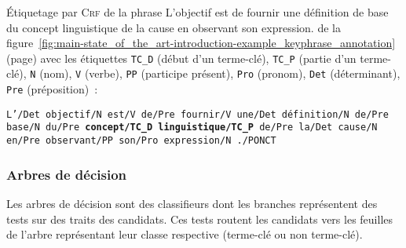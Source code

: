         \begin{example}\label{ex:crf_tagging}
          Étiquetage par \textsc{Crf} de la phrase \og{}L'objectif est de
          fournir une définition de base du concept linguistique de la cause en
          observant son expression.\fg{} de la
          figure~\ref{fig:main-state_of_the_art-introduction-example_keyphrase_annotation}
          (page\pageref{fig:main-state_of_the_art-introduction-example_keyphrase_annotation})
          avec les étiquettes \texttt{TC\_D} (début d'un terme-clé),
          \texttt{TC\_P} (partie d'un terme-clé), \texttt{N} (nom), \texttt{V}
          (verbe), \texttt{PP} (participe présent), \texttt{Pro} (pronom),
          \texttt{Det} (déterminant), \texttt{Pre} (préposition)~:\\
          \begin{center}\vspace{-1em}
            \parbox{.8\linewidth}{
              \texttt{L'/Det objectif/N est/V de/Pre fournir/V une/Det
              définition/N de/Pre base/N du/Pre \textbf{concept/TC\_D
              linguistique/TC\_P} de/Pre la/Det cause/N en/Pre observant/PP
              son/Pro expression/N ./PONCT}
            }
          \end{center}\vspace{.25em}
        \end{example}

      \subsubsection{Arbres de décision}
      \label{subsubsec:main-state_of_the_art-automatic_keyphrase_extraction-supervised_keyphrase_extraction-decision_trees}
        Les arbres de décision sont des classifieurs dont les branches
        représentent des tests sur des traits des candidats. Ces tests routent
        les candidats vers les feuilles de l'arbre représentant leur classe
        respective (\og{}terme-clé\fg{} ou \og{}non terme-clé\fg{}).

